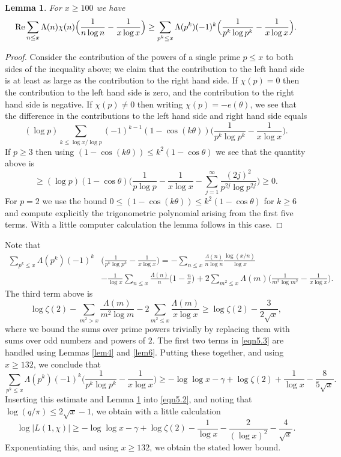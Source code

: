\documentclass [12pt]{amsart}
\newtheorem{lemma}{Lemma}[section]
\numberwithin{equation}{section}
\newcommand{\tRe}{\textup{Re}}
\begin{document}
\begin{lemma}
\label{lemma5.1} 
For $x\ge 100$ we have 
$$ 
\tRe \sum_{n\le x} \Lambda(n) \chi(n) 
\Big( \frac{1}{n\log n} -\frac{1}{x\log x}\Big) 
\ge \sum_{p^k \le x} \Lambda(p^k) (-1)^k \Big( \frac{1}{p^k \log p^k} -\frac{1}{x\log x}\Big). 
$$ 
\end{lemma} 
\begin{proof}  Consider the contribution of the powers of a single prime $p\le x$ to both sides of the 
inequality above; we claim that the contribution to the left hand side is at least as large as the contribution to the 
right hand side.  If $\chi(p) =0$ then the contribution to the left hand side is zero, and the contribution to 
the right hand side is negative.  If $\chi(p)\neq 0$ then writing $\chi(p) = -e(\theta)$, we see that the difference 
in the contributions to the left hand side and right hand side equals 
$$ 
(\log  p) \sum_{k\le \log x/\log p} (-1)^{k-1} (1-\cos (k\theta)) \Big( \frac{1}{p^k \log p^k } - \frac 1{x\log x}\Big). 
$$  
If $p\ge 3$ then using $(1-\cos(k\theta)) \le k^2 (1-\cos \theta)$ we see that the quantity above 
is 
$$ 
\ge (\log p) (1-\cos \theta) \Big( \frac{1}{p\log p} -\frac{1}{x\log x} - \sum_{j=1}^{\infty} \frac{(2j)^2}{p^{2j} \log p^{2j}}\Big) 
\ge 0. 
$$
For $p=2$ we use the bound $0\le (1-\cos (k\theta)) \le k^2(1-\cos \theta)$ for $k\ge 6$ and compute explicitly  
the trigonometric polynomial arising from the first five terms.  With a little computer calculation the lemma follows in this case. 
\end{proof} 


Note that 
\begin{align}
\label{eqn5.3}
\sum_{p^k \le x}  \Lambda(p^k) (-1)^k& \Big( \frac{1}{p^k \log p^k} -\frac{1}{x\log x}\Big) 
= -\sum_{n\le x} \frac{\Lambda(n)}{n \log n} \frac{\log (x/n)}{\log x} \nonumber \\
&-\frac{1}{\log x} 
\sum_{n\le x} \frac{\Lambda(n)}{n} \Big( 1-\frac nx\Big) + 2 \sum_{m^2\le x} 
\Lambda(m) \Big(\frac{1}{m^2 \log m^2} -\frac{1}{x\log x}\Big). 
\end{align}
The third term above is
$$ 
\log \zeta(2) - \sum_{m^2>x} \frac{\Lambda(m)}{m^2\log m} -2 \sum_{m^2\le x} \frac{\Lambda(m)}{x\log x} 
\ge \log \zeta(2) - \frac{3}{2\sqrt{x}},   
$$
where we bound the sums over prime powers trivially by replacing them with sums over odd numbers and powers of $2$.  
The first two terms in \eqref{eqn5.3} are handled using Lemmas \ref{lem4} and \ref{lem6}.   Putting these 
together, and using $x\ge 132$, we conclude that 
$$ 
\sum_{p^k \le x}  \Lambda(p^k) (-1)^k \Big( \frac{1}{p^k \log p^k} -\frac{1}{x\log x}\Big) 
\ge - \log \log x - \gamma  + \log \zeta(2)  +\frac{1}{\log x} - \frac{8}{5\sqrt{x}}.
$$ 
Inserting this estimate and Lemma \ref{lemma5.1} into \eqref{eqn5.2}, and noting that $\log (q/\pi) \le 2\sqrt{x}-1$, 
we obtain with a little calculation 
$$ 
\log |L(1,\chi)| \ge - \log \log x - \gamma +\log \zeta(2) -\frac{1}{\log x} -\frac{2}{(\log x)^2} - \frac{4}{\sqrt{x}}.
$$ 
Exponentiating this, and using $x\ge 132$, we obtain the stated lower bound. 
\end{document}
